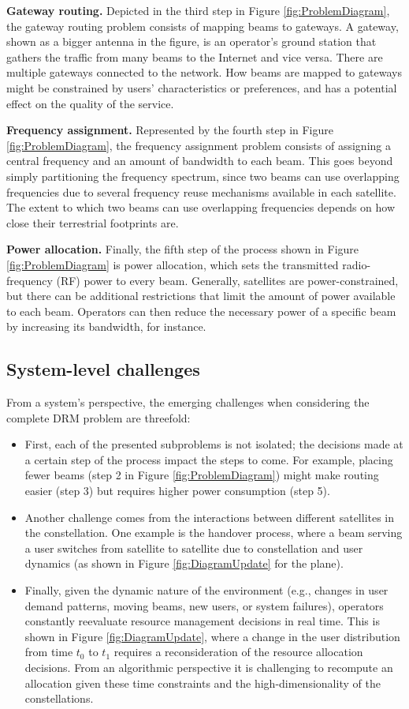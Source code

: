 \documentclass[letterpaper]{article} %
\begin{document}
\textbf{Gateway routing.}
Depicted in the third step in Figure \ref{fig:ProblemDiagram}, the gateway routing problem consists of mapping beams to gateways. A gateway, shown as a bigger antenna in the figure, is an operator's ground station that gathers the traffic from many beams to the Internet and vice versa. There are multiple gateways connected to the network. How beams are mapped to gateways might be constrained by users' characteristics or preferences, and has a potential effect on the quality of the service.

\textbf{Frequency assignment.} 
Represented by the fourth step in Figure \ref{fig:ProblemDiagram}, the frequency assignment problem consists of assigning a central frequency and an amount of bandwidth to each beam. This goes beyond simply partitioning the frequency spectrum, since two beams can use overlapping frequencies due to several frequency reuse mechanisms available in each satellite. The extent to which two beams can use overlapping frequencies depends on how close their terrestrial footprints are.

\textbf{Power allocation.}
Finally, the fifth step of the process shown in Figure \ref{fig:ProblemDiagram} is power allocation, which sets the transmitted radio-frequency (RF) power to every beam. Generally, satellites are power-constrained, but there can be additional restrictions that limit the amount of power available to each beam. Operators can then reduce the necessary power of a specific beam by increasing its bandwidth, for instance.


\subsection{System-level challenges}
\label{sec:2.3}
From a system's perspective, the emerging challenges when considering the complete DRM problem are threefold: 
\begin{itemize}
\item First, each of the presented subproblems is not isolated; the decisions made at a certain step of the process impact the steps to come. For example, placing fewer beams (step 2 in Figure \ref{fig:ProblemDiagram}) might make routing easier (step 3) but requires higher power consumption (step 5).
\item Another challenge comes from the interactions between different satellites in the constellation. One example is the handover process, where a beam serving a user switches from satellite to satellite due to constellation and user dynamics (as shown in Figure \ref{fig:DiagramUpdate} for the plane). 
\item Finally, given the dynamic nature of the environment (e.g., changes in user demand patterns, moving beams, new users, or system failures), operators constantly reevaluate resource management decisions in real time. This is shown in Figure \ref{fig:DiagramUpdate}, where a change in the user distribution from time $t_0$ to $t_1$ requires a reconsideration of the resource allocation decisions. From an algorithmic perspective it is challenging to recompute an allocation given these time constraints and the high-dimensionality of the constellations.
\end{itemize}
\end{document}
